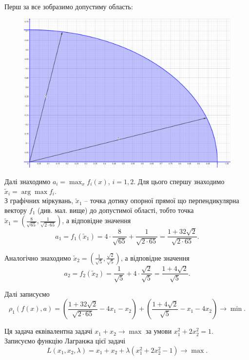 \begin{solution}
    Перш за все зобразимо допустиму область:
    \begin{figure}[H]
        \centering
        \includegraphics[width=\textwidth]{img/ideal_point_1.png}
    \end{figure}
    
    Далі знаходимо $a_i = \max_x f_i(x)$, $i = 1, 2$. Для цього спершу знаходимо $\tilde x_i = \arg \max f_i$. \\
    
    З графічних міркувань, $\tilde x_1$ -- точка дотику опорної прямої що перпендикулярна вектору $f_1$ (див. мал. вище) до допустимої області, тобто точка $\tilde x_1 = \left( \frac{8}{\sqrt{65}}, \frac{1}{\sqrt{2 \cdot 65}} \right)$, а відповідне значення \[ a_1 = f_1(\tilde x_1) = 4 \cdot \frac{8}{\sqrt{65}} + \frac{1}{\sqrt{2 \cdot 65}} = \frac{1 + 32 \sqrt{2}}{\sqrt{2 \cdot 65}}. \]
    
    Аналогічно знаходимо $\tilde x_2 = \left( \frac{1}{\sqrt{5}}, \frac{\sqrt{2}}{\sqrt{5}}\right)$, а відповідне значення \[ a_2 = f_2(\tilde x_2) = \frac{1}{\sqrt{5}} + 4 \cdot \frac{\sqrt{2}}{\sqrt{5}} = \frac{1 + 4 \sqrt{2}}{\sqrt{5}}. \]
    
    Далі записуємо \[ \rho_1(f(x), a) =  \left( \frac{1 + 32 \sqrt{2}}{\sqrt{2 \cdot 65}} - 4 x_1 - x_2 \right) + \left( \frac{1 + 4 \sqrt{2}}{\sqrt{5}} - x_1 - 4 x_2 \right) \to \min. \]
    
    Ця задача еквівалентна задачі $x_1 + x_2 \to \max$ за умови $x_1^2 + 2 x_2^2 = 1$. \\
    
    Записуємо функцію Лагранжа цієї задачі \[ L(x_1, x_2, \lambda) = x_1 + x_2 + \lambda (x_1^2 + 2 x_2^2 - 1) \to \max. \]
    

\end{solution}
